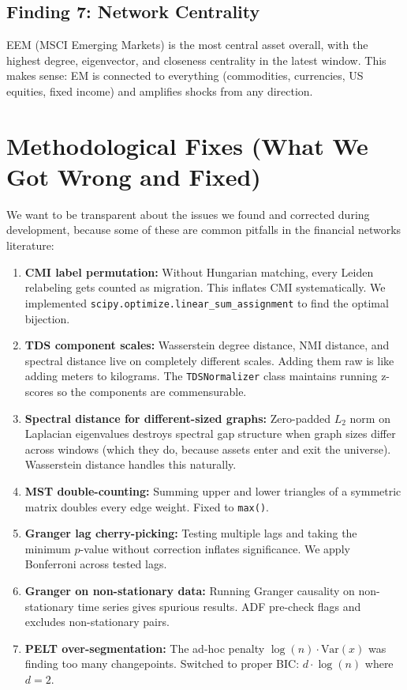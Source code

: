 \documentclass[12pt, letterpaper]{article}
\begin{document}
\subsection{Finding 7: Network Centrality}

EEM (MSCI Emerging Markets) is the most central asset overall, with the highest degree, eigenvector, and closeness centrality in the latest window. This makes sense: EM is connected to everything (commodities, currencies, US equities, fixed income) and amplifies shocks from any direction.

\section{Methodological Fixes (What We Got Wrong and Fixed)}

We want to be transparent about the issues we found and corrected during development, because some of these are common pitfalls in the financial networks literature:

\begin{enumerate}
    \item \textbf{CMI label permutation:} Without Hungarian matching, every Leiden relabeling gets counted as migration. This inflates CMI systematically. We implemented \texttt{scipy.optimize.linear\_sum\_assignment} to find the optimal bijection.

    \item \textbf{TDS component scales:} Wasserstein degree distance, NMI distance, and spectral distance live on completely different scales. Adding them raw is like adding meters to kilograms. The \texttt{TDSNormalizer} class maintains running z-scores so the components are commensurable.

    \item \textbf{Spectral distance for different-sized graphs:} Zero-padded $L_2$ norm on Laplacian eigenvalues destroys spectral gap structure when graph sizes differ across windows (which they do, because assets enter and exit the universe). Wasserstein distance handles this naturally.

    \item \textbf{MST double-counting:} Summing upper and lower triangles of a symmetric matrix doubles every edge weight. Fixed to \texttt{max()}.

    \item \textbf{Granger lag cherry-picking:} Testing multiple lags and taking the minimum $p$-value without correction inflates significance. We apply Bonferroni across tested lags.

    \item \textbf{Granger on non-stationary data:} Running Granger causality on non-stationary time series gives spurious results. ADF pre-check flags and excludes non-stationary pairs.

    \item \textbf{PELT over-segmentation:} The ad-hoc penalty $\log(n) \cdot \text{Var}(x)$ was finding too many changepoints. Switched to proper BIC: $d \cdot \log(n)$ where $d=2$.
\end{enumerate}
\end{document}
